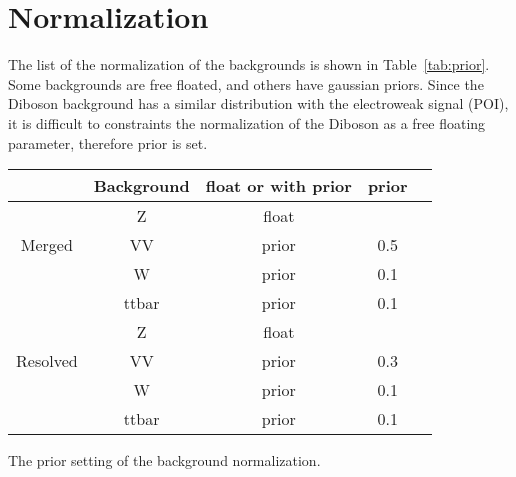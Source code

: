 \section{Normalization}
The list of the normalization of the backgrounds is shown in Table~\ref{tab:prior}.
Some backgrounds are free floated, and others have gaussian priors. Since the Diboson background has a similar distribution with the electroweak signal (POI), it is difficult to constraints the normalization of the Diboson as a free floating parameter, therefore prior is set.
\begin{center}
\begin{tabular}{ |c|c|c|c|c| } 
\hline
 & Background & float or with prior & prior \\
\hline
\multirow{3}{4em}{Merged} & Z & float &       \\ 
& VV                          & prior &   0.5 \\ 
& W                           & prior &   0.1 \\ 
& ttbar                       & prior &   0.1 \\ 
\hline
\multirow{3}{4em}{Resolved} & Z & float &       \\ 
& VV                          & prior &   0.3 \\ 
& W                           & prior &   0.1 \\ 
& ttbar                       & prior &   0.1 \\ 
\hline
\end{tabular}
\caption{\label{tab:prior} The prior setting of the background normalization. }
\end{center}

